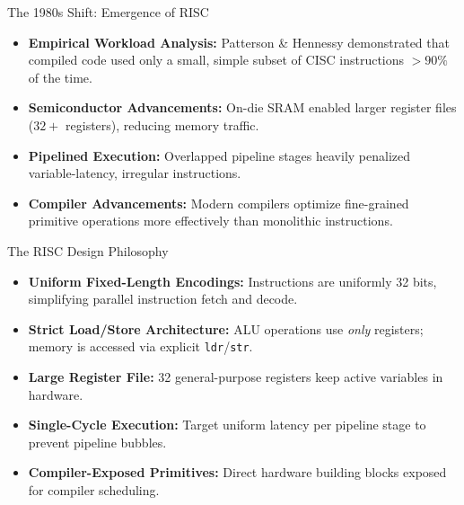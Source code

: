\documentclass[aspectratio=169,11pt,t]{beamer}
\newcommand{\key}[1]{\textbf{#1}}
\newcommand{\code}[1]{\texttt{#1}}
\begin{document}
\begin{frame}{The 1980s Shift: Emergence of RISC}
\large
\begin{itemize}\setlength{\itemsep}{8pt}
  \item \key{Empirical Workload Analysis:} Patterson \& Hennessy demonstrated that compiled code used only a small, simple subset of CISC instructions $>90\%$ of the time.
  \item \key{Semiconductor Advancements:} On-die SRAM enabled larger register files ($32+$ registers), reducing memory traffic.
  \item \key{Pipelined Execution:} Overlapped pipeline stages heavily penalized variable-latency, irregular instructions.
  \item \key{Compiler Advancements:} Modern compilers optimize fine-grained primitive operations more effectively than monolithic instructions.
\end{itemize}
\end{frame}


\begin{frame}{The RISC Design Philosophy}
\large
\begin{itemize}\setlength{\itemsep}{8pt}
  \item \key{Uniform Fixed-Length Encodings:} Instructions are uniformly 32 bits, simplifying parallel instruction fetch and decode.
  \item \key{Strict Load/Store Architecture:} ALU operations use \emph{only} registers; memory is accessed via explicit \code{ldr}/\code{str}.
  \item \key{Large Register File:} 32 general-purpose registers keep active variables in hardware.
  \item \key{Single-Cycle Execution:} Target uniform latency per pipeline stage to prevent pipeline bubbles.
  \item \key{Compiler-Exposed Primitives:} Direct hardware building blocks exposed for compiler scheduling.
\end{itemize}
\end{frame}

\end{document}
